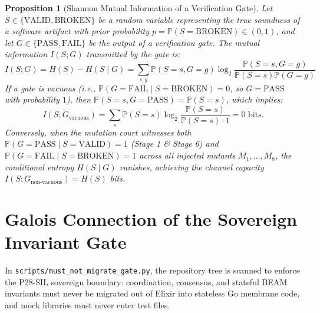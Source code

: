 \documentclass[10pt,twoside,openany]{book}
\theoremstyle{plain}
\newtheorem{proposition}[theorem]{Proposition}
\theoremstyle{definition}
\theoremstyle{remark}
\newcommand{\Prob}{\mathbb{P}}
\begin{document}
\begin{proposition}[Shannon Mutual Information of a Verification Gate]
Let $S \in \{\mathrm{VALID}, \mathrm{BROKEN}\}$ be a random variable representing the true soundness of a software artifact with prior probability $p = \Prob(S = \mathrm{BROKEN}) \in (0, 1)$, and let $G \in \{\mathrm{PASS}, \mathrm{FAIL}\}$ be the output of a verification gate. The mutual information $I(S; G)$ transmitted by the gate is:
\begin{equation}
I(S; G) = H(S) - H(S \mid G) = \sum_{s, g} \Prob(S=s, G=g) \log_2 \frac{\Prob(S=s, G=g)}{\Prob(S=s)\Prob(G=g)}
\end{equation}
If a gate is vacuous (i.e., $\Prob(G = \mathrm{FAIL} \mid S = \mathrm{BROKEN}) = 0$, so $G = \mathrm{PASS}$ with probability $1$), then $\Prob(S=s, G=\mathrm{PASS}) = \Prob(S=s)$, which implies:
\begin{equation}
I(S; G_{\mathrm{vacuous}}) = \sum_s \Prob(S=s) \log_2 \frac{\Prob(S=s)}{\Prob(S=s) \cdot 1} = 0\text{ bits.}
\end{equation}
Conversely, when the mutation court witnesses both $\Prob(G = \mathrm{PASS} \mid S = \mathrm{VALID}) = 1$ (Stage 1 \& Stage 6) and $\Prob(G = \mathrm{FAIL} \mid S = \mathrm{BROKEN}) = 1$ across all injected mutants $M_1, \dots, M_8$, the conditional entropy $H(S \mid G)$ vanishes, achieving the channel capacity $I(S; G_{\mathrm{non\text{-}vacuous}}) = H(S)$ bits.
\end{proposition}

\section{Galois Connection of the Sovereign Invariant Gate}
In \texttt{scripts/must\_not\_migrate\_gate.py}, the repository tree is scanned to enforce the P28-SIL sovereign boundary: coordination, consensus, and stateful BEAM invariants must never be migrated out of Elixir into stateless Go membrane code, and mock libraries must never enter test files.
\end{document}
